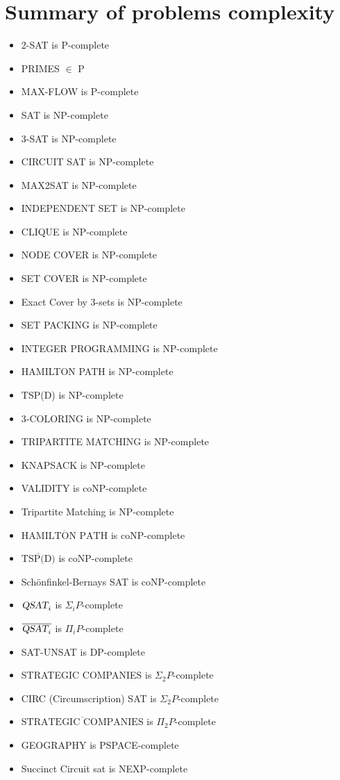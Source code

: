 \section{Summary of problems complexity}
\begin{itemize}
    \item 2-SAT is P-complete
    \item PRIMES $\in$ P
    \item MAX-FLOW is P-complete
    \item SAT is NP-complete
    \item 3-SAT is NP-complete
    \item CIRCUIT SAT is NP-complete
    \item MAX2SAT is NP-complete
    \item INDEPENDENT SET is NP-complete
    \item CLIQUE is NP-complete
    \item NODE COVER is NP-complete
    \item SET COVER is NP-complete
    \item Exact Cover by 3-sets is NP-complete
    \item SET PACKING is NP-complete
    \item INTEGER PROGRAMMING is NP-complete
    \item HAMILTON PATH is NP-complete
    \item TSP(D) is NP-complete
    \item 3-COLORING is NP-complete
    \item TRIPARTITE MATCHING is NP-complete
    \item KNAPSACK is NP-complete
    \item VALIDITY is coNP-complete
    \item Tripartite Matching is NP-complete
    \item $\overline{\text{HAMILTON PATH}}$ is coNP-complete
    \item $\overline{\text{TSP(D)}}$ is coNP-complete
    \item Schönfinkel-Bernays SAT is coNP-complete
    \item $\textsl{QSAT}_i$ is $\Sigma_iP$-complete
    \item $\overline{\textsl{QSAT}_i}$ is $\Pi_iP$-complete
    \item SAT-UNSAT is DP-complete
    \item STRATEGIC COMPANIES is $\Sigma_2P$-complete
    \item CIRC (Circumscription) SAT is $\Sigma_2P$-complete
    \item $\overline{\text{STRATEGIC COMPANIES}}$ is $\Pi_2P$-complete
    \item GEOGRAPHY is PSPACE-complete
    \item Succinct Circuit sat is NEXP-complete
\end{itemize}